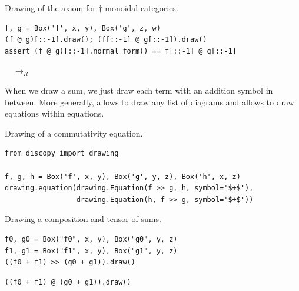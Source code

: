 \begin{example}
{\normalfont Drawing of the axiom for $\dagger$-monoidal categories.}

\begin{verbatim}
f, g = Box('f', x, y), Box('g', z, w)
(f @ g)[::-1].draw(); (f[::-1] @ g[::-1]).draw()
assert (f @ g)[::-1].normal_form() == f[::-1] @ g[::-1]
\end{verbatim}

\begin{center}
$\quad \to_R \quad$ 
\end{center}
\end{example}

When we draw a sum, we just draw each term with an addition symbol in between.
More generally,  allows to draw any list of diagrams and  allows to draw equations within equations.

\begin{example}
{\normalfont Drawing of a commutativity equation.}

\begin{verbatim}
from discopy import drawing

f, g, h = Box('f', x, y), Box('g', y, z), Box('h', x, z)
drawing.equation(drawing.Equation(f >> g, h, symbol='$+$'),
                 drawing.Equation(h, f >> g, symbol='$+$'))
\end{verbatim}
\end{example}

\begin{example}
{\normalfont Drawing a composition and tensor of sums.}

\begin{verbatim}
f0, g0 = Box("f0", x, y), Box("g0", y, z)
f1, g1 = Box("f1", x, y), Box("g1", y, z)
((f0 + f1) >> (g0 + g1)).draw()
\end{verbatim}

\begin{verbatim}
((f0 + f1) @ (g0 + g1)).draw()
\end{verbatim}
\end{example}

